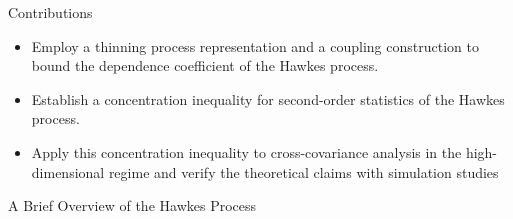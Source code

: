 \documentclass{beamer}		%
\begin{document}
\begin{frame}{Contributions}

\begin{itemize}
    
    \item Employ a thinning process representation and a coupling construction to bound the dependence coefficient of the Hawkes process.
    
    \item Establish a concentration inequality for second-order statistics of the Hawkes process.
    
    \item Apply this concentration inequality to cross-covariance analysis in the high-dimensional regime and verify the theoretical claims with simulation studies
    
\end{itemize}
    
\end{frame}







\begin{frame}[noframenumbering]

\begin{itemize}

    \begin{LARGE}
    
    \item {}
    
    \item A Brief Overview of the Hawkes Process
    
    \item {}
    
    \item {}

    \end{LARGE}
    
\end{itemize}
	
\end{frame}
\end{document}
